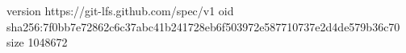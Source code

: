 version https://git-lfs.github.com/spec/v1
oid sha256:7f0bb7e72862c6c37abc41b241728eb6f503972e587710737e2d4de579b36c70
size 1048672
